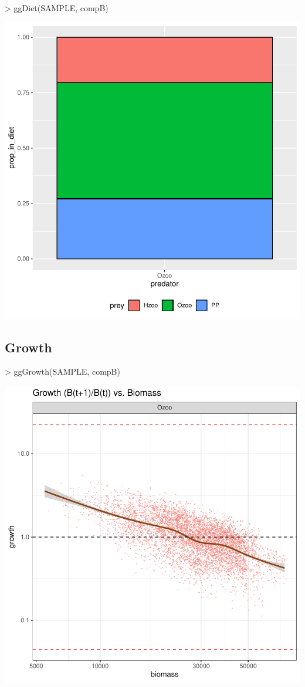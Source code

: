 \documentclass{article}
\begin{document}
\begin{Schunk}
\begin{Sinput}
> ggDiet(SAMPLE, compB)
\end{Sinput}
\end{Schunk}
\includegraphics{barents_SM-019}

\subsection{Growth}

\begin{Schunk}
\begin{Sinput}
> ggGrowth(SAMPLE, compB)
\end{Sinput}
\end{Schunk}
\includegraphics{barents_SM-020}
\end{document}
